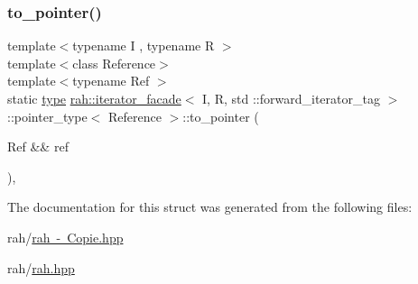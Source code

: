 \subsubsection{\texorpdfstring{to\_pointer()}{to\_pointer()}}
{\footnotesize\ttfamily template$<$typename I , typename R $>$ \\
template$<$class Reference$>$ \\
template$<$typename Ref $>$ \\
static \mbox{\hyperlink{structrah_1_1iterator__facade_3_01_i_00_01_r_00_01std_01_1_1forward__iterator__tag_01_4_1_1pointer__type_a78f5c4b9c79f5e8f6b15eade261ee718}{type}} \mbox{\hyperlink{structrah_1_1iterator__facade}{rah\+::iterator\+\_\+facade}}$<$ I, R, std \+::forward\+\_\+iterator\+\_\+tag $>$\+::pointer\+\_\+type$<$ Reference $>$\+::to\+\_\+pointer (\begin{DoxyParamCaption}\item[{Ref \&\&}]{ref }\end{DoxyParamCaption})\hspace{0.3cm}{\ttfamily [inline]}, {\ttfamily [static]}}



The documentation for this struct was generated from the following files\+:\begin{DoxyCompactItemize}
\item 
rah/\mbox{\hyperlink{rah_01-_01_copie_8hpp}{rah -\/ Copie.\+hpp}}\item 
rah/\mbox{\hyperlink{rah_8hpp}{rah.\+hpp}}\end{DoxyCompactItemize}

